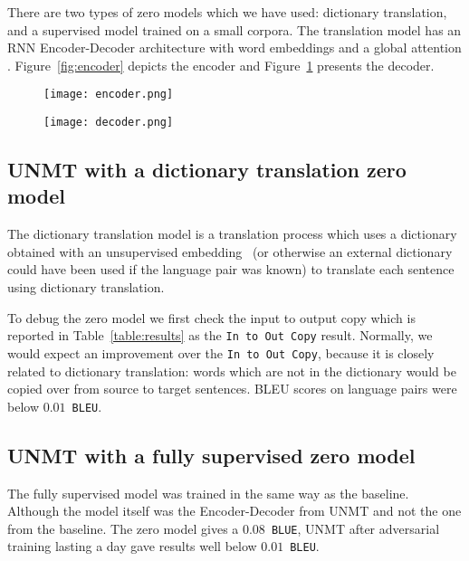 \documentclass[]{article}
\begin{document}
There are two types of zero models which we have used: dictionary translation, and a supervised model trained on a small corpora.
The translation model has an RNN Encoder-Decoder architecture \citep{cho2014learning} with word embeddings and a global attention \citep{luong2015effective}.
Figure~\ref{fig:encoder} depicts the encoder and Figure~\ref{fig:decoder} presents the decoder.

\begin{figure}
\centering
\begin{minipage}{.5\textwidth}
  \centering
  \texttt{[image: encoder.png]}
  \label{fig:encoder}
\end{minipage}\hfill
\begin{minipage}{.5\textwidth}
  \centering
  \texttt{[image: decoder.png]}
  \label{fig:decoder}
\end{minipage}
\end{figure}

\subsection{\ac{UNMT} with a dictionary translation zero model}
\label{sect:fully_unsupervised}
The dictionary translation model is a translation process which uses a dictionary obtained with an unsupervised embedding~\citep{conneau2017word} (or otherwise an external dictionary could have been used if the language pair was known) to translate each sentence using dictionary translation.

To debug the zero model we first check the input to output copy which is reported in Table~\ref{table:results} as the {\tt In to Out Copy} result.
Normally, we would expect an improvement over the {\tt In to Out Copy}, because it is closely related to dictionary translation: words which are not in the dictionary would be copied over from source to target sentences.
BLEU scores on language pairs were below $0.01$~{\tt BLEU}.

\subsection{\ac{UNMT} with a fully supervised zero model}
\label{sect:semi_unsupervised}
The fully supervised model was trained in the same way as the baseline.
Although the model itself was the Encoder-Decoder from UNMT and not the one from the baseline.
The zero model gives a $0.08$~{\tt BLUE}, UNMT after adversarial training lasting a day gave results well below $0.01$~{\tt BLEU}.
\end{document}
